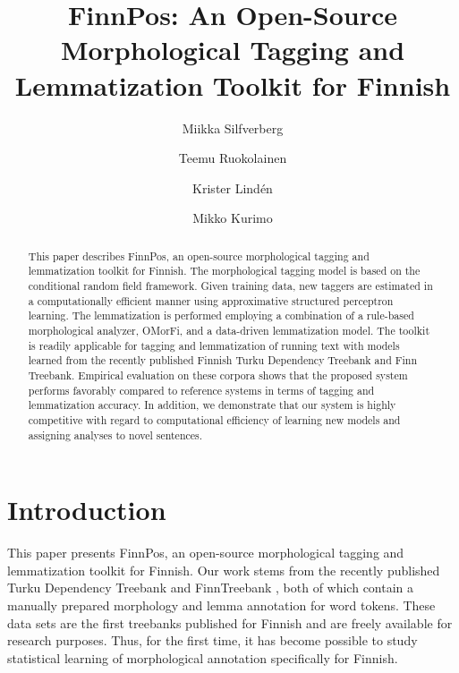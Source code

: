 \documentclass[smallextended]{svjour3}       %
\begin{document}
\title{FinnPos: An Open-Source Morphological Tagging and Lemmatization Toolkit for Finnish}
\author{Miikka Silfverberg \and Teemu Ruokolainen \and Krister Lind\'en \and Mikko Kurimo}



\maketitle


\begin{abstract}
\noindent This paper describes FinnPos, an open-source morphological tagging and lemmatization toolkit for Finnish. %
The morphological tagging model is based on the conditional random field framework. Given training data, new taggers are estimated in a computationally efficient manner using approximative structured perceptron learning. The lemmatization is performed employing a combination of a rule-based morphological analyzer, OMorFi, and a data-driven lemmatization model. %
The toolkit is readily applicable for tagging and lemmatization of running text with models learned from the recently published Finnish Turku Dependency Treebank and Finn Treebank.  Empirical evaluation on these corpora shows that the proposed system performs favorably compared to reference systems in terms of tagging and lemmatization accuracy. In addition, we demonstrate that our system is highly competitive with regard to computational efficiency of learning new models and assigning analyses to novel sentences.

\end{abstract}

\section{Introduction}
\label{sec: introduction}

This paper presents FinnPos, an open-source morphological tagging and lemmatization toolkit for Finnish. Our work stems from the recently published Turku Dependency Treebank \citep{haverinen2009,haverinen2013} and FinnTreebank \citep{voutilainen2011}, both of which contain a manually prepared morphology and lemma annotation for word tokens. These data sets are the first treebanks published for Finnish and are freely available for research purposes. Thus, for the first time, it has become possible to study statistical learning of morphological annotation specifically for Finnish. %
\end{document}
